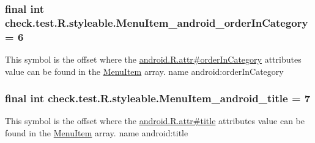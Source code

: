 \subsubsection[{Menu\+Item\+\_\+android\+\_\+order\+In\+Category}]{\setlength{\rightskip}{0pt plus 5cm}final int check.\+test.\+R.\+styleable.\+Menu\+Item\+\_\+android\+\_\+order\+In\+Category = 6\hspace{0.3cm}{\ttfamily [static]}}\label{classcheck_1_1test_1_1_r_1_1styleable_a65a13cc3cfb4d4146adc454569280de7}
This symbol is the offset where the \hyperlink{}{android.\+R.\+attr\#order\+In\+Category} attribute\textquotesingle{}s value can be found in the \hyperlink{classcheck_1_1test_1_1_r_1_1styleable_af26376072eab01d1b4197e48992dc936}{Menu\+Item} array.  name android\+:order\+In\+Category \hypertarget{classcheck_1_1test_1_1_r_1_1styleable_a156b50bbe0771f25d5dab6d62c313320}{}
\subsubsection[{Menu\+Item\+\_\+android\+\_\+title}]{\setlength{\rightskip}{0pt plus 5cm}final int check.\+test.\+R.\+styleable.\+Menu\+Item\+\_\+android\+\_\+title = 7\hspace{0.3cm}{\ttfamily [static]}}\label{classcheck_1_1test_1_1_r_1_1styleable_a156b50bbe0771f25d5dab6d62c313320}
This symbol is the offset where the \hyperlink{}{android.\+R.\+attr\#title} attribute\textquotesingle{}s value can be found in the \hyperlink{classcheck_1_1test_1_1_r_1_1styleable_af26376072eab01d1b4197e48992dc936}{Menu\+Item} array.  name android\+:title \hypertarget{classcheck_1_1test_1_1_r_1_1styleable_a789a23064482ca589c0b3d8f0a0adaae}{}
